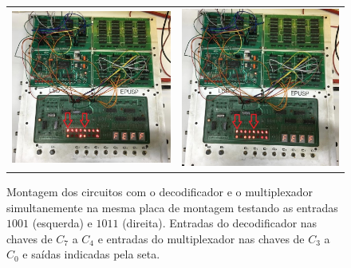 \documentclass[a4,12pt]{horizon-theme}
\begin{document}
\begin{figure}[!ht]
  \centering
  \begin{tabular}{cc}
    \includegraphics[height=0.46\textwidth]{1001_in.jpeg} & \includegraphics[height=0.46\textwidth]{1011_in.jpeg}
  \end{tabular}
  \caption{Montagem dos circuitos com o decodificador e o multiplexador simultanemente na mesma placa de montagem testando as entradas $1001$ (esquerda) e $1011$ (direita). Entradas do decodificador nas chaves de $C_7$ a $C_4$ e entradas do multiplexador nas chaves de $C_3$ a $C_0$ e saídas indicadas pela seta.}
  \label{fig:montagem3}
\end{figure}
\newpage



\end{document}
